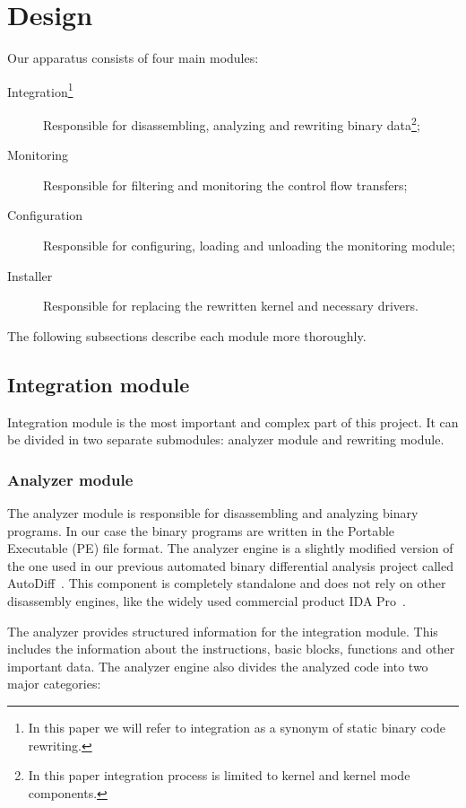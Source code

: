 \documentclass[10pt,twocolumn,a4paper]{article}
\begin{document}
\section{Design}
\label{sec:design}

Our apparatus consists of four main modules:

\begin{description}
    \item[Integration\footnote{In this paper we will refer to integration as a synonym of static binary code rewriting.}] Responsible for disassembling, analyzing and rewriting binary data{\footnote{In this paper integration process is limited to kernel and kernel mode components.}};
    \item[Monitoring] Responsible for filtering and monitoring the control flow transfers;
    \item[Configuration] Responsible for configuring, loading and unloading the monitoring module;
    \item[Installer] Responsible for replacing the rewritten kernel and necessary drivers.
\end{description}

The following subsections describe each module more thoroughly.

\subsection{Integration module}

Integration module is the most important and complex part of this project. It can be divided in two separate submodules: analyzer module and rewriting module.

\subsubsection{Analyzer module}

The analyzer module is responsible for disassembling and analyzing binary programs. In our case the binary programs are written in the Portable Executable (PE) file format.  The analyzer engine is a slightly modified version of the one used in our previous automated binary differential analysis project called AutoDiff~\cite{AutoDiff}. This component is completely standalone and does not rely on other disassembly engines, like the widely used commercial product IDA Pro~\cite{ida_pro_com}.

The analyzer provides structured information for the integration module. This includes the information about the instructions, basic blocks, functions and other important data. The analyzer engine also divides the analyzed code into two major categories:
\end{document}
